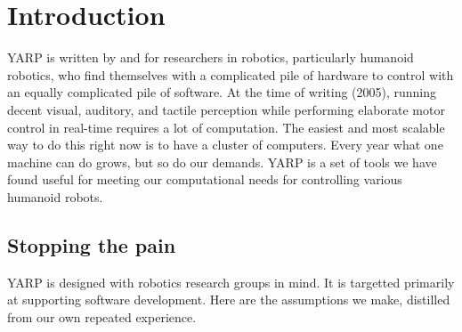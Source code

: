 \section{Introduction}

YARP is written by and for researchers in robotics, particularly
humanoid robotics, who find themselves with a complicated pile of
hardware to control with an equally complicated pile of software. 
%
At the time of writing (2005), running decent visual, auditory, and
tactile perception while performing elaborate motor control in
real-time requires a lot of computation. The easiest and most scalable
way to do this right now is to have a cluster of computers. Every year
what one machine can do grows, but so do our demands. YARP is a set of
tools we have found useful for meeting our computational needs for
controlling various humanoid robots.

\subsection*{Stopping the pain}

YARP is designed with robotics research groups in mind.  
%
%
It is targetted primarily at supporting software development.
%
%
Here are the assumptions we make, distilled from our own repeated
experience.  
%


